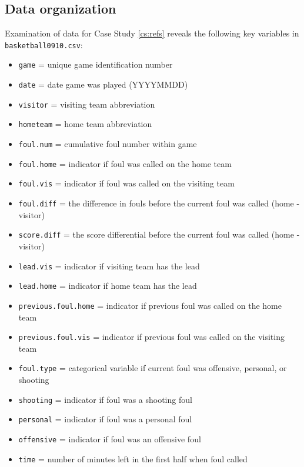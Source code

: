 \documentclass[
]{krantz}
\providecommand{\tightlist}{%
  \setlength{\itemsep}{0pt}\setlength{\parskip}{0pt}}
\begin{document}
\hypertarget{data-organization}{%
\subsection{Data organization}\label{data-organization}}

Examination of data for Case Study \ref{cs:refs} reveals the following key variables in \texttt{basketball0910.csv}:

\begin{itemize}
\tightlist
\item
  \texttt{game} = unique game identification number
\item
  \texttt{date} = date game was played (YYYYMMDD)
\item
  \texttt{visitor} = visiting team abbreviation
\item
  \texttt{hometeam} = home team abbreviation
\item
  \texttt{foul.num} = cumulative foul number within game
\item
  \texttt{foul.home} = indicator if foul was called on the home team
\item
  \texttt{foul.vis} = indicator if foul was called on the visiting team
\item
  \texttt{foul.diff} = the difference in fouls before the current foul was called (home - visitor)
\item
  \texttt{score.diff} = the score differential before the current foul was called (home - visitor)
\item
  \texttt{lead.vis} = indicator if visiting team has the lead
\item
  \texttt{lead.home} = indicator if home team has the lead
\item
  \texttt{previous.foul.home} = indicator if previous foul was called on the home team
\item
  \texttt{previous.foul.vis} = indicator if previous foul was called on the visiting team
\item
  \texttt{foul.type} = categorical variable if current foul was offensive, personal, or shooting
\item
  \texttt{shooting} = indicator if foul was a shooting foul
\item
  \texttt{personal} = indicator if foul was a personal foul
\item
  \texttt{offensive} = indicator if foul was an offensive foul
\item
  \texttt{time} = number of minutes left in the first half when foul called
\end{itemize}
\end{document}
